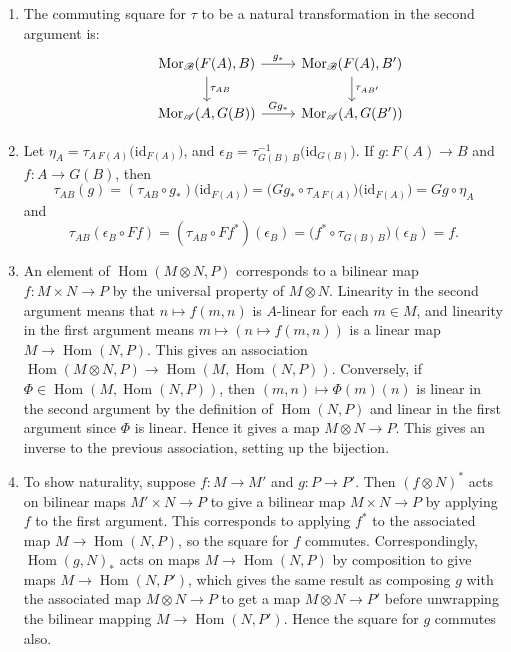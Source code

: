 \documentclass{report}
\newcommand{\id}{{\mathrm{id}}} %
\DeclareMathOperator{\Mor}{Mor}
\DeclareMathOperator{\Hom}{Hom}
\begin{document}
\begin{enumerate}[label=\textbf{1.5.\Alph*.}]
	\item The commuting square for $\tau$ to be a natural transformation in
	      the second argument is:
	      \begin{equation*}
		      \begin{tikzcd}
			      &\Mor_\mathscr{B}(F(A),B)
			      \arrow{r}{g_*}
			      \arrow{d}{\tau_{AB}}
			      &\Mor_\mathscr{B}(F(A),B')
			      \arrow{d}{\tau_{AB'}} \\
			      &\Mor_\mathscr{A}(A,G(B))
			      \arrow{r}{Gg_*}
			      &\Mor_\mathscr{A}(A,G(B'))
		      \end{tikzcd}
	      \end{equation*}

	\item Let $\eta_A=\tau_{A\,F(A)}\bigl(\id_{F(A)}\bigr)$, and
	      $\epsilon_B=\tau_{G(B)\,B}^{-1}\bigl(\id_{G(B)}\bigr)$. If
	      $g:F(A)\to B$ and $f:A\to G(B)$, then
	      \begin{equation*}
		      \tau_{AB}(g)
		      = (\tau_{AB}\circ g_*)\bigl(\id_{F(A)}\bigr)
		      = \bigl(Gg_*\circ\tau_{A\,F(A)}\bigr)\bigl(\id_{F(A)}\bigr)
		      = Gg\circ\eta_A
	      \end{equation*}
	      and
	      \begin{equation*}
		      \tau_{AB}(\epsilon_B\circ Ff)
		      = (\tau_{AB}\circ Ff^*)(\epsilon_B)
		      = \bigl(f^*\circ\tau_{G(B)\,B}\bigr)(\epsilon_B)
		      = f.
	      \end{equation*}

	\item An element of $\Hom(M\otimes N,P)$ corresponds to a bilinear map
	      $f:M\times N\to P$ by the universal property of $M\otimes N$.
	      Linearity in the second argument means that $n\mapsto f(m,n)$ is
	      $A$-linear for each $m\in M$, and linearity in the first argument
	      means $m\mapsto(n\mapsto f(m,n))$ is a linear map $M\to\Hom(N,P)$.
	      This gives an association $\Hom(M\otimes N,P)\to\Hom(M,\Hom(N,P))$.
	      Conversely, if $\Phi\in\Hom(M,\Hom(N,P))$, then
	      $(m,n)\mapsto\Phi(m)(n)$ is linear in the second argument by the
	      definition of $\Hom(N,P)$ and linear in the first argument since
	      $\Phi$ is linear. Hence it gives a map $M\otimes N\to P$. This gives
	      an inverse to the previous association, setting up the bijection.

	\item To show naturality, suppose $f:M\to M'$ and $g:P\to P'$. Then
	      $(f\otimes N)^*$ acts on bilinear maps $M'\times N\to P$ to give a
	      bilinear map $M\times N\to P$ by applying $f$ to the first argument.
	      This corresponds to applying $f^*$ to the associated map
	      $M\to\Hom(N,P)$, so the square for $f$ commutes. Correspondingly,
	      $\Hom(g,N)_*$ acts on maps $M\to\Hom(N,P)$ by composition to give
	      maps $M\to\Hom(N,P')$, which gives the same result as composing $g$
	      with the associated map $M\otimes N\to P$ to get a map
	      $M\otimes N\to P'$ before unwrapping the bilinear mapping
	      $M\to\Hom(N,P')$. Hence the square for $g$ commutes also.


\end{enumerate}
\end{document}
